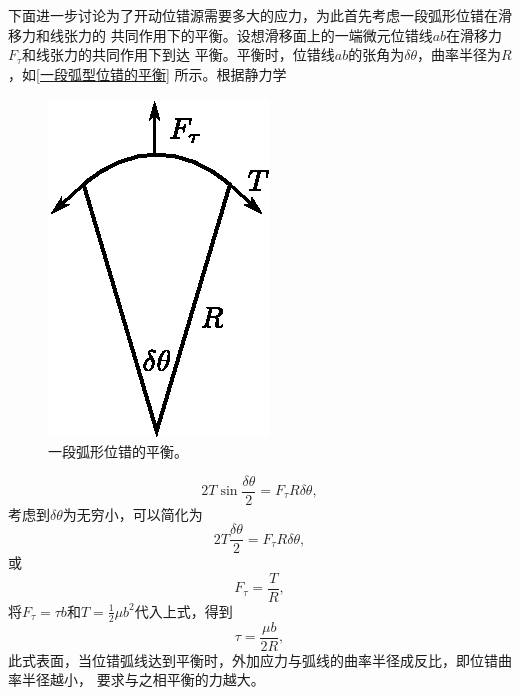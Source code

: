                 下面进一步讨论为了开动位错源需要多大的应力，为此首先考虑一段弧形位错在滑移力和线张力的
                共同作用下的平衡。设想滑移面上的一端微元位错线$ab$在滑移力$F_\tau$和线张力的共同作用下到达
                平衡。平衡时，位错线$ab$的张角为$\delta\theta$，曲率半径为$R$，如\autoref{一段弧型位错的平衡}
                所示。根据静力学
                \begin{figure}[ht]
                    \centering
                    \includegraphics[scale=1]{fig/balance_of_FR_source.eps}
                    \caption{一段弧形位错的平衡。}
                    \label{一段弧型位错的平衡}
                \end{figure}
                \begin{equation}
                    2T\sin\frac{\delta\theta}{2}=F_\tau R\delta\theta,
                \end{equation}
                考虑到$\delta\theta$为无穷小，可以简化为
                \begin{equation}
                    2T\frac{\delta\theta}{2}=F_\tau R\delta\theta,
                \end{equation}
                或
                \begin{equation}
                    F_\tau=\frac{T}{R},
                \end{equation}
                将$F_\tau=\tau b$和$T=\frac{1}{2}\mu b^2$代入上式，得到
                \begin{equation}
                    \tau=\frac{\mu b}{2R}\label{线张力和切应力平衡条件},
                \end{equation}
                此式表面，当位错弧线达到平衡时，外加应力与弧线的曲率半径成反比，即位错曲率半径越小，
                要求与之相平衡的力越大。

